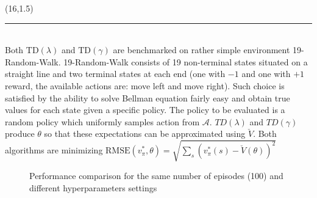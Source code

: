 \documentclass[a0]{a0poster}
\def\Head#1{\noindent{\LARGE\color{bluegray} #1}\bigskip}
\begin{document}
\begin{textblock}{7.0}(16,1.5)

\medskip
\hrule\medskip
\Head{Experiment}\\

Both $\text{TD}(\lambda)$ and $\text{TD}(\gamma)$ are benchmarked on rather
simple environment 19-Random-Walk. 19-Random-Walk consists of 19 non-terminal
states situated on a straight line and two terminal states at each end (one
with $-1$ and one with $+1$ reward, the available actions are: move left and
move right). Such choice is satisfied by the ability to solve Bellman equation
fairly easy and obtain true values for each state given a specific policy. The
policy to be evaluated is a random policy which uniformly samples action from
$\mathcal{A}$. $TD(\lambda)$ and $TD(\gamma)$ produce $\theta$ so that these
expectations can be approximated using $\check{V}$. Both algorithms are
minimizing $\text{RMSE}(v_\pi^*, \theta) = \sqrt{\sum_{s} (v_\pi^*(s) -
\check{V}(\theta))^2}$

\begin{center}
\begin{figure}%
    \centering
    \qquad
    \caption{Performance comparison for the same number of episodes (100) and
             different hyperparameters settings}%
    \label{fig:results}%
\end{figure}
\end{center}


\end{textblock}
\end{document}
